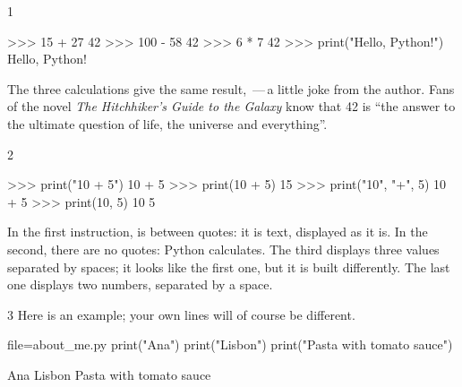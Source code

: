 
\begin{corrigeatoi}{1}
\begin{console}
>>> 15 + 27
42
>>> 100 - 58
42
>>> 6 * 7
42
>>> print("Hello, Python!")
Hello, Python!
\end{console}
The three calculations give the same result, \,---\,a little joke from the author. Fans of
the novel \emph{The Hitchhiker's Guide to the Galaxy} know that 42 is \enquote{the answer to the
ultimate question of life, the universe and everything}.
\end{corrigeatoi}

\begin{corrigeatoi}{2}
\begin{console}
>>> print("10 + 5")
10 + 5
>>> print(10 + 5)
15
>>> print("10", "+", 5)
10 + 5
>>> print(10, 5)
10 5
\end{console}
In the first instruction,  is between quotes: it is text, displayed as it is. In the
second, there are no quotes: Python calculates. The third displays three values separated by
spaces; it looks like the first one, but it is built differently. The last one displays two numbers,
separated by a space.
\end{corrigeatoi}

\begin{corrigeatoi}{3}
Here is an example; your own lines will of course be different.
\begin{code}{file=about_me.py}
print("Ana")
print("Lisbon")
print("Pasta with tomato sauce")
\end{code}
\begin{sortie}
Ana
Lisbon
Pasta with tomato sauce
\end{sortie}
\end{corrigeatoi}


